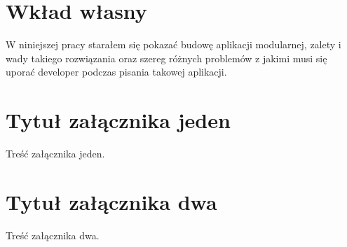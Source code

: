 \documentclass[brudnopis]{xmgr}
\begin{document}
\chapter{Wkład własny}
\summary
W niniejszej pracy starałem się pokazać budowę aplikacji modularnej, zalety i wady takiego rozwiązania oraz szereg różnych problemów z jakimi musi się uporać developer podczas pisania takowej aplikacji. 
\appendix
\chapter{Tytuł załącznika jeden}

Treść załącznika jeden.
\chapter{Tytuł załącznika dwa}

Treść załącznika dwa.




\nocite {magiaUI}
\nocite {design}
\nocite {projektowanieUI}
\nocite {StiveKrug}
\nocite{DouglasCrockford}
\nocite {UIRails}
\nocite {modelingUI}
\nocite {rspecDoc}
\nocite {railsDoc}
\nocite {emberDoc}
\nocite{emberCLIDoc}
\nocite{emberRails}
\nocite{emberTutorial}
\nocite{emberIntro}

\listoftables

\listoffigures

\oswiadczenie
\end{document}
